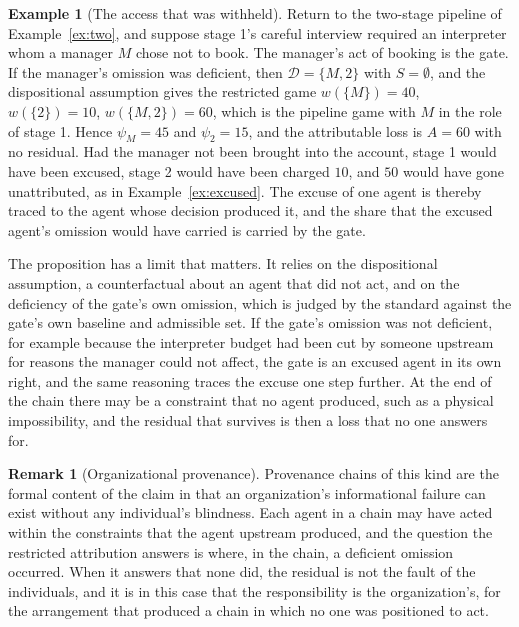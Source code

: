 \documentclass[11pt]{article}
\newcommand{\Dfc}{\mathcal D}
\theoremstyle{plain}
\theoremstyle{definition}
\newtheorem{remark}{Remark}
\newtheorem{example}{Example}
\begin{document}
\begin{example}[The access that was withheld]\label{ex:gate}
Return to the two-stage pipeline of Example~\ref{ex:two}, and suppose stage 1's careful interview required an interpreter whom a manager $M$ chose not to book. The manager's act of booking is the gate. If the manager's omission was deficient, then $\Dfc=\{M,2\}$ with $S=\emptyset$, and the dispositional assumption gives the restricted game $w(\{M\})=40$, $w(\{2\})=10$, $w(\{M,2\})=60$, which is the pipeline game with $M$ in the role of stage 1. Hence $\psi_M=45$ and $\psi_2=15$, and the attributable loss is $A=60$ with no residual. Had the manager not been brought into the account, stage 1 would have been excused, stage 2 would have been charged $10$, and $50$ would have gone unattributed, as in Example~\ref{ex:excused}. The excuse of one agent is thereby traced to the agent whose decision produced it, and the share that the excused agent's omission would have carried is carried by the gate.
\end{example}

The proposition has a limit that matters. It relies on the dispositional assumption, a counterfactual about an agent that did not act, and on the deficiency of the gate's own omission, which is judged by the standard against the gate's own baseline and admissible set. If the gate's omission was not deficient, for example because the interpreter budget had been cut by someone upstream for reasons the manager could not affect, the gate is an excused agent in its own right, and the same reasoning traces the excuse one step further. At the end of the chain there may be a constraint that no agent produced, such as a physical impossibility, and the residual that survives is then a loss that no one answers for.

\begin{remark}[Organizational provenance]\label{rem:org}
Provenance chains of this kind are the formal content of the claim in \cite{flyxion2026inputs} that an organization's informational failure can exist without any individual's blindness. Each agent in a chain may have acted within the constraints that the agent upstream produced, and the question the restricted attribution answers is where, in the chain, a deficient omission occurred. When it answers that none did, the residual is not the fault of the individuals, and it is in this case that the responsibility is the organization's, for the arrangement that produced a chain in which no one was positioned to act.
\end{remark}
\end{document}
